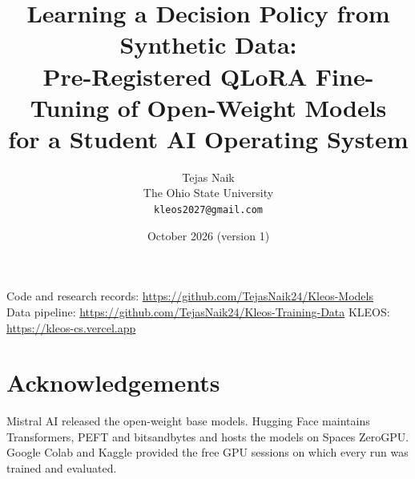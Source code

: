 \documentclass[10pt,letterpaper]{article}
\title{\Large\bfseries Learning a Decision Policy from Synthetic Data:\\
Pre-Registered QLoRA Fine-Tuning of Open-Weight Models\\
for a Student AI Operating System}
\author{Tejas Naik\\
The Ohio State University\\
\texttt{kleos2027@gmail.com}}
\date{October 2026 (version 1)}
\newcommand{\kleos}{KLEOS}
\begin{document}
\maketitle

\begin{center}\small
Code and research records: \url{https://github.com/TejasNaik24/Kleos-Models}\\
Data pipeline: \url{https://github.com/TejasNaik24/Kleos-Training-Data}\qquad
\kleos{}: \url{https://kleos-cs.vercel.app}
\end{center}

\begin{abstract}

\end{abstract}













\section*{Acknowledgements}
Mistral AI released the open-weight base models. Hugging Face maintains Transformers, PEFT and bitsandbytes and hosts the models on Spaces ZeroGPU. Google Colab and Kaggle provided the free GPU sessions on which every run was trained and evaluated.




\clearpage
\appendix

\end{document}
